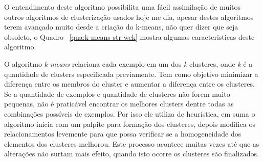  O entendimento deste algoritmo possibilita uma fácil assimilação de  muitos outros algoritmos de clusterização usados hoje me dia,
 apesar destes algoritmos terem avançado muito desde a criação do k-means, não quer dizer que seja obsoleto,  
 o Quadro ~\ref{qua:k-means-str-wek} mostra algumas caracteristicas deste algoritmo.

 O algoritmo \textit{k-means} relaciona cada exemplo em um dos \textit{k} clusteres, onde \textit{k} é a quantidade de clusters 
 especificada previamente. Tem como objetivo minimizar a diferença entre os membros do cluster e aumentar a diferença entre os clusteres.
 Se a quantidade de exemplos e quantidade de clusteres não forem muito pequenas, não é praticável encontrar os melhores clusters dentre 
 todas as combinações possíveis de exemplos. Por isso ele utiliza de heurística, em suma o algoritmo inicia com um palpite para 
 formação dos clusteres, depois modifica os relacionamentos levemente para que possa verificar se a homogeneidade dos elementos
 dos clusteres melhorou. Este processo acontece muitas vezes até que as alterações não surtam mais efeito, quando isto ocorre os
 clusteres são finalizados. 
 
 \begin{figure}[ht!]
	\centering
\end{figure}
\begin{figure}[ht!]
	\centering
\end{figure}

